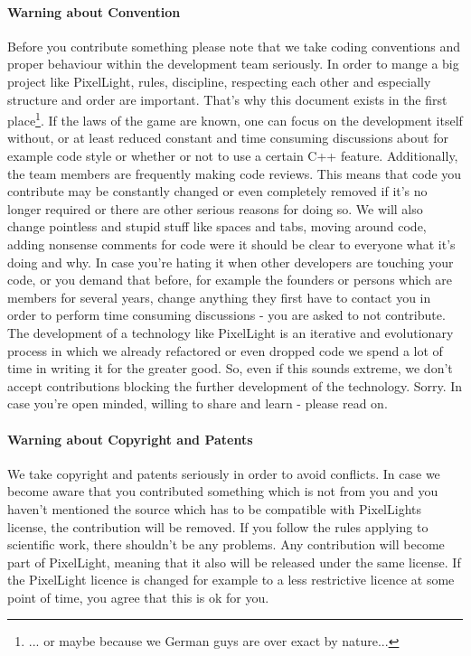 \paragraph{Warning about Convention}
Before you contribute something please note that we take coding conventions and proper behaviour within the development team seriously. In order to mange a big project like PixelLight, rules, discipline, respecting each other and especially structure and order are important. That's why this document exists in the first place\footnote{... or maybe because we German guys are over exact by nature...}. If the laws of the game are known, one can focus on the development itself without, or at least reduced constant and time consuming discussions about for example code style or whether or not to use a certain C++ feature. Additionally, the team members are frequently making code reviews. This means that code you contribute may be constantly changed or even completely removed if it's no longer required or there are other serious reasons for doing so. We will also change pointless and stupid stuff like spaces and tabs, moving around code, adding nonsense comments for code were it should be clear to everyone what it's doing and why. In case you're hating it when other developers are touching your code, or you demand that before, for example the founders or persons which are members for several years, change anything they first have to contact you in order to perform time consuming discussions - you are asked to not contribute. The development of a technology like PixelLight is an iterative and evolutionary process in which we already refactored or even dropped code we spend a lot of time in writing it for the greater good. So, even if this sounds extreme, we don't accept contributions blocking the further development of the technology. Sorry. In case you're open minded, willing to share and learn - please read on.


\paragraph{Warning about Copyright and Patents}
We take copyright and patents seriously in order to avoid conflicts. In case we become aware that you contributed something which is not from you and you haven't mentioned the source which has to be compatible with PixelLights license, the contribution will be removed. If you follow the rules applying to scientific work, there shouldn't be any problems. Any contribution will become part of PixelLight, meaning that it also will be released under the same license. If the PixelLight licence is changed for example to a less restrictive licence at some point of time, you agree that this is ok for you.


